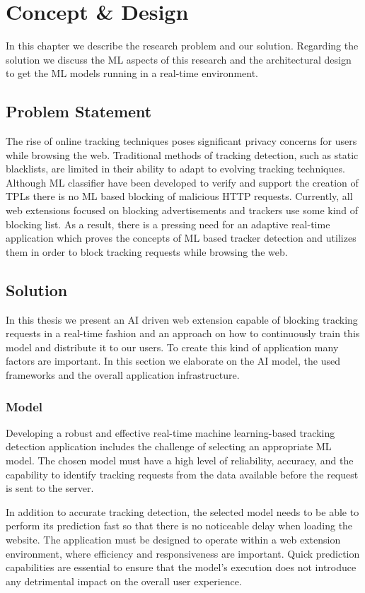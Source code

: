 \chapter{Concept \& Design}
\label{cha:conceptanddesign}

In this chapter we describe the research problem and our solution. Regarding the solution we discuss 
the ML aspects of this research and the architectural design to get the ML models running in a real-time
environment.

\section{Problem Statement}
The rise of online tracking techniques poses significant privacy concerns for users while browsing the web.
Traditional methods of tracking detection, such as static blacklists, are limited in their ability to adapt
to evolving tracking techniques. Although ML classifier have been developed to verify and support
the creation of TPLs there is no ML based blocking of malicious HTTP requests. Currently, all web extensions focused on blocking
advertisements and trackers use some kind of blocking list. As a result, there is a pressing need for an adaptive real-time application which
proves the concepts of ML based tracker detection and utilizes them in order to block tracking requests while browsing the web.
\section{Solution}
In this thesis we present an AI driven web extension capable of blocking tracking requests in a real-time fashion and an approach on how
to continuously train this model and distribute it to our users. To create this kind of application many factors are important. In this 
section we elaborate on the AI model, the used frameworks and the overall application infrastructure.
\subsection{Model}
Developing a robust and effective real-time machine learning-based tracking detection application includes the challenge
of selecting an appropriate ML model. The chosen model must have a high level of reliability, accuracy, and the capability to identify tracking requests from the data available before the request is sent
to the server.

In addition to accurate tracking detection, the selected model needs to be able to perform its prediction fast so that there is no noticeable delay when loading the website.
The application must be designed to operate within a web extension environment, where efficiency and responsiveness are important.
Quick prediction capabilities are essential to ensure that the model's execution does not introduce any detrimental impact on
the overall user experience.

